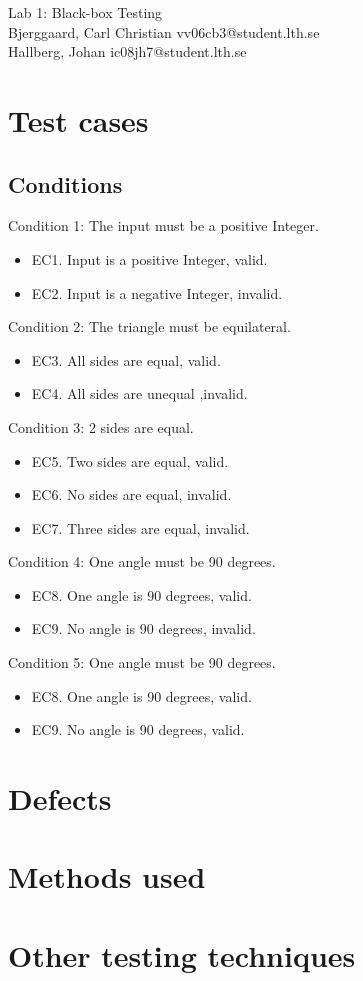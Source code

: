 \documentclass[titlepage]{article}
\begin{document}
\begin{center}
	\huge{Lab 1: Black-box Testing } \\
	\small{Bjerggaard, Carl Christian vv06cb3@student.lth.se \\Hallberg, Johan ic08jh7@student.lth.se}

\vspace*{1cm}

\end{center}

\thispagestyle{empty}

\clearpage
\section{Test cases}
\subsection{Conditions}
Condition 1: The input must be a positive Integer.
\begin{itemize}
	\item EC1. Input is a positive Integer, valid.
	\item EC2. Input is a negative Integer, invalid.
\end{itemize}

Condition 2: The triangle must be equilateral.
\begin{itemize}
	\item EC3. All sides are equal, valid. 
	\item EC4. All sides are unequal ,invalid. 
\end{itemize}

Condition 3: 2 sides are equal.  
\begin{itemize}
	\item EC5. Two sides are equal, valid. 
	\item EC6. No sides are equal, invalid. 
	\item EC7. Three sides are equal, invalid. 
\end{itemize}

Condition 4: One angle must be 90 degrees. 
\begin{itemize}
	\item EC8. One angle is 90 degrees, valid. 
	\item EC9. No angle is 90 degrees, invalid. 
\end{itemize}

Condition 5: One angle must be 90 degrees. 
\begin{itemize}
	\item EC8. One angle is 90 degrees, valid. 
	\item EC9. No angle is 90 degrees, valid. 
\end{itemize}






  
\section{Defects}


\section{Methods used}


\section{Other testing techniques}
\end{document}
